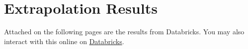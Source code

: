 \section{Extrapolation Results}
\label{app:results}

Attached on the following pages are the results from Databricks. You may also interact with this online on \href{\databricksurl}{Databricks}.